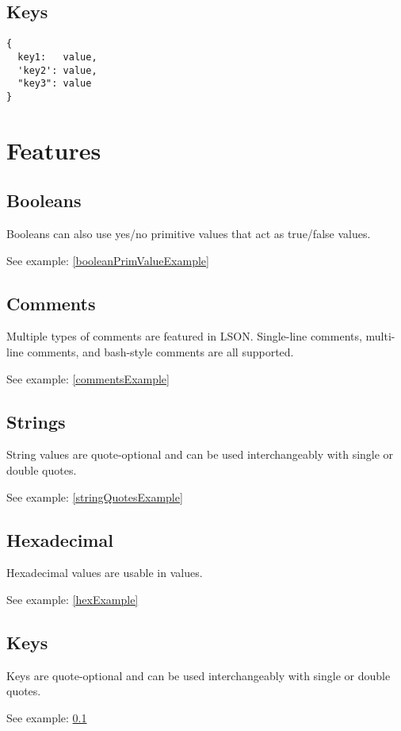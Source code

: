 \documentclass[12pt]{article}
\begin{document}
\newpage

\subsection{Keys}
\label{keyExample}
\begin{lstlisting}
{
  key1:   value,
  'key2': value,
  "key3": value
}
\end{lstlisting}

\newpage

\section{Features}
\subsection{Booleans}
Booleans can also use yes/no primitive values that act as true/false values.

See example: \ref{booleanPrimValueExample}

\subsection{Comments}
Multiple types of comments are featured in LSON. Single-line comments, multi-line comments, and bash-style comments are all supported.

See example: \ref{commentsExample}

\subsection{Strings}
String values are quote-optional and can be used interchangeably with single or double quotes.

See example: \ref{stringQuotesExample}

\subsection{Hexadecimal}
Hexadecimal values are usable in values.

See example: \ref{hexExample}

\subsection{Keys}
Keys are quote-optional and can be used interchangeably with single or double quotes.

See example: \ref{keyExample}
\end{document}
